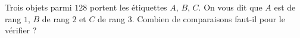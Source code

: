 Trois objets parmi $128$ portent les étiquettes $A$, $B$, $C$. On vous dit que $A$ est de rang $1$, $B$ de rang $2$ et $C$ de rang $3$. Combien de comparaisons faut-il pour le vérifier ?
